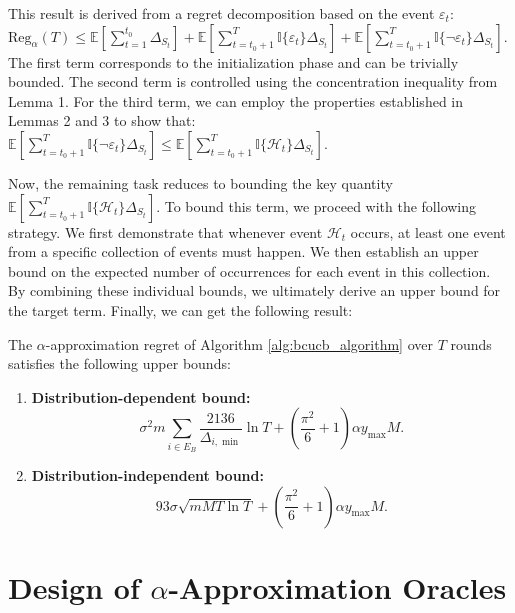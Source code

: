 \documentclass[opre,sglanonrev]{informs4}
\begin{document}
This result is derived from a regret decomposition based on the event \(\varepsilon_t\):
$
\text{Reg}_{\alpha}(T) \leq \mathbb{E}\left[\sum_{t=1}^{t_0} \Delta_{S_t}\right] + \mathbb{E}\left[\sum_{t=t_0+1}^{T} \mathbb{I}\{\varepsilon_t\} \Delta_{S_t}\right] + \mathbb{E}\left[\sum_{t=t_0+1}^{T} \mathbb{I}\{\neg \varepsilon_t\} \Delta_{S_t}\right]
$. The first term corresponds to the initialization phase and can be trivially bounded. The second term is controlled using the concentration inequality from Lemma 1. For the third term, we can employ the properties established in Lemmas 2 and 3 to show that:
$
\mathbb{E}\left[\sum_{t=t_0+1}^{T} \mathbb{I}\{\neg \varepsilon_t\} \Delta_{S_t}\right] \leq \mathbb{E}\left[\sum_{t=t_0+1}^{T} \mathbb{I}\{\mathcal{H}_t\} \Delta_{S_t}\right].
$ 

Now, the remaining task reduces to bounding the key quantity \(\mathbb{E}\left[\sum_{t=t_0+1}^{T} \mathbb{I}\{\mathcal{H}_t\} \Delta_{S_t}\right]\). To bound this term, we proceed with the following strategy. We first demonstrate that whenever event \(\mathcal{H}_t\) occurs, at least one event from a specific collection of events must happen. We then establish an upper bound on the expected number of occurrences for each event in this collection. By combining these individual bounds, we ultimately derive an upper bound for the target term. Finally, we can get the following result:

\begin{theorem}
\label{thm:regret_bound}
The $\alpha$-approximation regret of Algorithm \ref{alg:bcucb_algorithm} over $T$ rounds satisfies the following upper bounds:
\begin{enumerate}
    \item \textbf{Distribution-dependent bound:}
    $$
    \sigma^2 m \sum_{i \in E_B} \frac{2136}{\Delta_{i,\min}} \ln T + \left(\frac{\pi^2}{6} + 1\right) \alpha y_{\text{max}} M.
    $$
    
    \item \textbf{Distribution-independent bound:}
    $$
    93\sigma \sqrt{m M T \ln T} + \left(\frac{\pi^2}{6} + 1\right) \alpha y_{\text{max}} M.
    $$
\end{enumerate}  
\end{theorem}


\section{Design of $\alpha$-Approximation Oracles}
\label{oracle}
\end{document}
